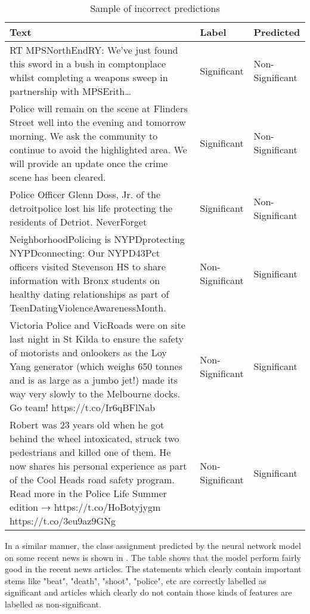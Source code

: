 \begin{table}
\begin{center}
\caption{Sample of incorrect predictions}
\label{tbl:incorrect_predictions}
\begin{tabular}{p{9cm}p{2.5cm}p{2.5cm}}
\toprule 
Text&Label&Predicted\\
\midrule 
RT MPSNorthEndRY: We've just found this sword in a bush in comptonplace whilst completing a weapons sweep in partnership with MPSErith…&Significant&Non-Significant\\
\hline
Police will remain on the scene at Flinders Street well into the evening and tomorrow morning. We ask the community to continue to avoid the highlighted area. We will provide an update once the crime scene has been cleared. &Significant&Non-Significant\\
\hline
Police Officer Glenn Doss, Jr. of the detroitpolice lost his life protecting the residents of Detriot. NeverForget &Significant&Non-Significant\\
\hline
NeighborhoodPolicing is NYPDprotecting NYPDconnecting: Our NYPD43Pct officers visited Stevenson HS to share information with Bronx students on healthy dating relationships as part of TeenDatingViolenceAwarenessMonth.&Non-Significant&Significant\\
\hline
Victoria Police and VicRoads were on site last night in St Kilda to ensure the safety of motorists and onlookers as the Loy Yang generator (which weighs 650 tonnes and is as large as a jumbo jet!) made its way very slowly to the Melbourne docks. Go team! https://t.co/Ir6qBFlNab
&Non-Significant&Significant\\
\hline
Robert was 23 years old when he got behind the wheel intoxicated, struck two pedestrians and killed one of them. He now shares his personal experience as part of the Cool Heads road safety program. Read more in the Police Life Summer edition → https://t.co/HoBotyjygm https://t.co/3eu9az9GNg&Non-Significant&Significant\\
\bottomrule
\end{tabular}
\end{center}
\end{table}

In a similar manner, the class assignment predicted by the neural network model on some recent news  is shown in . The table shows that the model perform fairly good in the recent news articles. The statements which clearly contain important stems like "beat", "death", "shoot", "police", etc are correctly labelled as significant and articles which clearly do not contain those kinds of features are labelled as non-significant.

